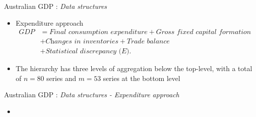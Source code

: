\documentclass[11pt,xcolor=dvipsnames,handout]{beamer} %
\begin{document}

\begin{frame}{Australian GDP : \textit{Data structures}}
\begin{itemize}[<+-| alert@+>]
	\item[] 
	
	\begin{block}{Expenditure approach}
		\begin{align*}
		\textit{GDP}
		& = \textit{Final consumption expenditure}
		+ \textit{Gross fixed capital formation} \\
		& + \textit{Changes in inventories}
		+ \textit{Trade balance}\\
		&+ \textit{Statistical discrepancy (E)}.
		\end{align*}
	\end{block}
	
	\item The hierarchy has three levels of aggregation below the top-level, with a total of $n=80$ series and $m=53$ series at the bottom level
	
\end{itemize}
\end{frame}



\begin{frame}{Australian GDP : \textit{Data structures - Expenditure approach}}
\begin{itemize}[<+-| alert@+>]
\item[] 
\begin{figure}
\end{figure}	

\end{itemize}
\end{frame}
\end{document}
